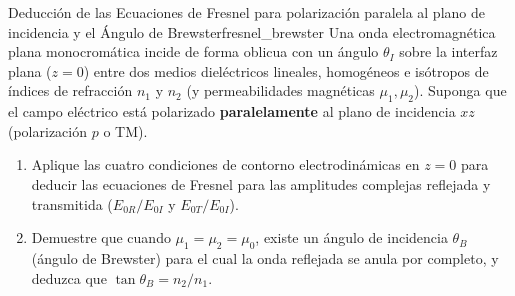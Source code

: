 \documentclass[11pt,a4paper]{book}
\begin{document}
\begin{ejercicio}{Deducción de las Ecuaciones de Fresnel para polarización paralela al plano de incidencia y el Ángulo de Brewster}{fresnel_brewster}
Una onda electromagnética plana monocromática incide de forma oblicua con un ángulo $\theta_I$ sobre la interfaz plana ($z = 0$) entre dos medios dieléctricos lineales, homogéneos e isótropos de índices de refracción $n_1$ y $n_2$ (y permeabilidades magnéticas $\mu_1, \mu_2$). Suponga que el campo eléctrico está polarizado \textbf{paralelamente} al plano de incidencia $xz$ (polarización $p$ o TM).
\begin{enumerate}[label=\alph*)]
    \item Aplique las cuatro condiciones de contorno electrodinámicas en $z = 0$ para deducir las ecuaciones de Fresnel para las amplitudes complejas reflejada y transmitida ($E_{0R}/E_{0I}$ y $E_{0T}/E_{0I}$).
    \item Demuestre que cuando $\mu_1 = \mu_2 = \mu_0$, existe un ángulo de incidencia $\theta_B$ (ángulo de Brewster) para el cual la onda reflejada se anula por completo, y deduzca que $\tan\theta_B = n_2/n_1$.
\end{enumerate}
\end{ejercicio}
\end{document}
